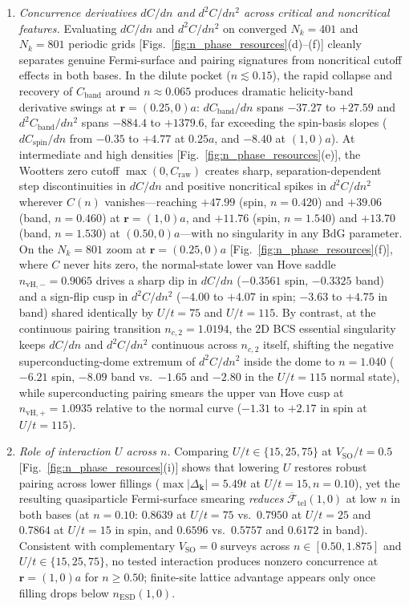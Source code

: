 \documentclass[aps,prb,twocolumn,superscriptaddress,longbibliography]{revtex4-2}
\begin{document}
\begin{enumerate}
\item \emph{Concurrence derivatives $dC/dn$ and $d^2C/dn^2$ across critical and noncritical features.}
Evaluating $dC/dn$ and $d^2C/dn^2$ on converged $N_k=401$ and $N_k=801$
periodic grids [Figs.~\ref{fig:n_phase_resources}(d)--(f)] cleanly
separates genuine Fermi-surface and pairing signatures from noncritical
cutoff effects in both bases. In the dilute pocket ($n\lesssim 0.15$),
the rapid collapse and recovery of $C_{\mathrm{band}}$ around
$n\approx 0.065$ produces dramatic helicity-band derivative swings at
$\mathbf{r}=(0.25,0)a$: $dC_{\mathrm{band}}/dn$ spans $-37.27$ to $+27.59$
and $d^2C_{\mathrm{band}}/dn^2$ spans $-884.4$ to $+1379.6$, far exceeding
the spin-basis slopes ($dC_{\mathrm{spin}}/dn$ from $-0.35$ to $+4.77$ at
$0.25a$, and $-8.40$ at $(1,0)a$). At intermediate and high densities
[Fig.~\ref{fig:n_phase_resources}(e)], the Wootters zero cutoff
$\max(0,C_{\mathrm{raw}})$ creates sharp, separation-dependent
step discontinuities in $dC/dn$ and positive noncritical spikes in
$d^2C/dn^2$ wherever $C(n)$ vanishes---reaching $+47.99$ (spin, $n=0.420$)
and $+39.06$ (band, $n=0.460$) at $\mathbf{r}=(1,0)a$, and $+11.76$
(spin, $n=1.540$) and $+13.70$ (band, $n=1.530$) at $(0.50,0)a$---with
no singularity in any BdG parameter. On the $N_k=801$ zoom at
$\mathbf{r}=(0.25,0)a$ [Fig.~\ref{fig:n_phase_resources}(f)], where $C$
never hits zero, the normal-state lower van Hove saddle
$n_{\mathrm{vH},-}=0.9065$ drives a sharp dip in $dC/dn$ ($-0.3561$ spin,
$-0.3325$ band) and a sign-flip cusp in $d^2C/dn^2$ ($-4.00$ to $+4.07$
in spin; $-3.63$ to $+4.75$ in band) shared identically by $U/t=75$ and
$U/t=115$. By contrast, at the continuous pairing transition
$n_{c,2}=1.0194$, the 2D BCS essential singularity keeps $dC/dn$ and
$d^2C/dn^2$ continuous across $n_{c,2}$ itself, shifting the negative
superconducting-dome extremum of $d^2C/dn^2$ inside the dome to
$n=1.040$ ($-6.21$ spin, $-8.09$ band vs.\ $-1.65$ and $-2.80$ in the
$U/t=115$ normal state), while superconducting pairing smears the
upper van Hove cusp at $n_{\mathrm{vH},+}=1.0935$ relative to the normal
curve ($-1.31$ to $+2.17$ in spin at $U/t=115$).

\item \emph{Role of interaction $U$ across $n$.}
Comparing $U/t\in\{15,25,75\}$ at $V_{\mathrm{SO}}/t=0.5$
[Fig.~\ref{fig:n_phase_resources}(i)] shows that lowering $U$ restores
robust pairing across lower fillings ($\max|\Delta_{\mathbf{k}}|=5.49t$ at
$U/t=15, n=0.10$), yet the resulting quasiparticle Fermi-surface
smearing \emph{reduces} $\overline{\mathcal{F}}_{\mathrm{tel}}(1,0)$ at
low $n$ in both bases (at $n=0.10$: $0.8639$ at $U/t=75$ vs.\ $0.7950$
at $U/t=25$ and $0.7864$ at $U/t=15$ in spin, and $0.6596$ vs.\ $0.5757$
and $0.6172$ in band). Consistent with complementary $V_{\mathrm{SO}}=0$
surveys across $n\in[0.50,1.875]$ and $U/t\in\{15,25,75\}$, no tested
interaction produces nonzero concurrence at $\mathbf{r}=(1,0)a$ for
$n\ge 0.50$; finite-site lattice advantage appears only once filling
drops below $n_{\mathrm{ESD}}(1,0)$.
\end{enumerate}
\end{document}
